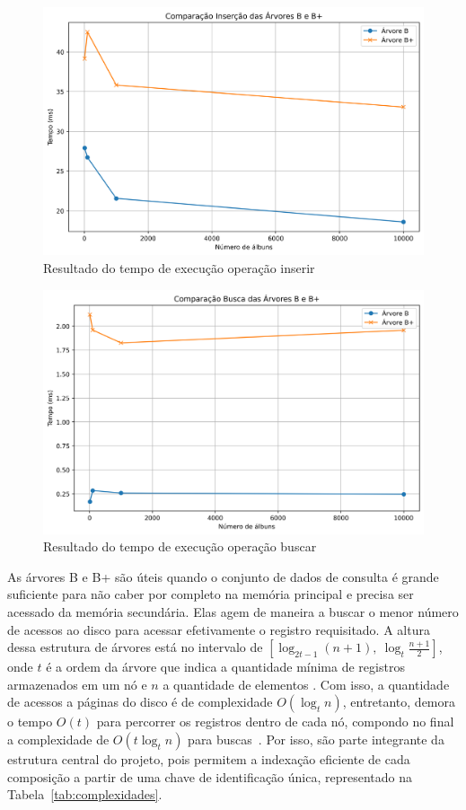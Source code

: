 \documentclass[12pt]{article}
\begin{document}
\begin{figure}[ht]
\centering
\includegraphics[width=1\textwidth]{figuras/graph_insert.png}
\caption{Resultado do tempo de execução operação inserir}
\label{fig:graph_bt}
\end{figure}

\begin{figure}[ht]
\centering
\includegraphics[width=1\textwidth]{figuras/graph_search.png}
\caption{Resultado do tempo de execução operação buscar}
\label{fig:graph_bpt}
\end{figure}

As árvores B e B\nolinebreak+ são úteis quando o conjunto de dados de consulta é
grande suficiente para não caber por completo na memória principal e precisa ser
acessado da memória secundária. Elas agem de maneira a buscar o menor número de
acessos ao disco para acessar efetivamente o registro requisitado. A altura
dessa estrutura de árvores está no intervalo de $[\log_{2t-1} (n+1),\ \log_t
\frac{n + 1}{2}]$, onde $t$ é a ordem da árvore que indica a quantidade mínima
de registros armazenados em um nó e $n$ a quantidade de elementos
\cite{clrs:22}. Com isso, a quantidade de acessos a páginas do disco é de
complexidade $O(\log_t n)$, entretanto, demora o tempo $O(t)$ para percorrer os
registros dentro de cada nó, compondo no final a complexidade de $O(t \log_t n)$
para buscas~\cite{clrs:22,Pm:10}. Por isso, são parte integrante da estrutura
central do projeto, pois permitem a indexação eficiente de cada composição a
partir de uma chave de identificação única, representado na
Tabela~\ref{tab:complexidades}.
\end{document}
